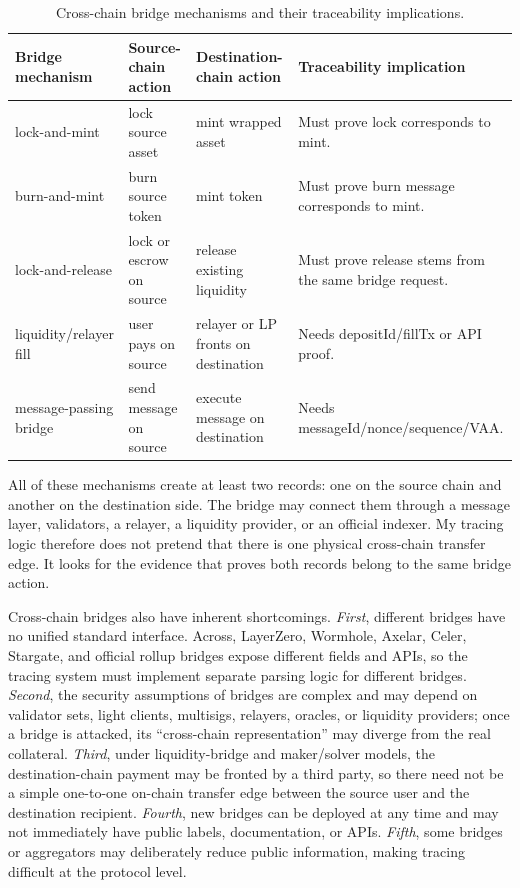 \documentclass[12pt,a4paper]{article}
\begin{document}
\begin{table}[htbp]
\centering
\caption{Cross-chain bridge mechanisms and their traceability implications.}
\label{tab:bridge_mech}
\small
\begin{tabularx}{\textwidth}{l Y Y Y}
\toprule
\textbf{Bridge mechanism} & \textbf{Source-chain action} & \textbf{Destination-chain action} & \textbf{Traceability implication} \\
\midrule
lock-and-mint & lock source asset & mint wrapped asset & Must prove lock corresponds to mint. \\
burn-and-mint & burn source token & mint token & Must prove burn message corresponds to mint. \\
lock-and-release & lock or escrow on source & release existing liquidity & Must prove release stems from the same bridge request. \\
liquidity/relayer fill & user pays on source & relayer or LP fronts on destination & Needs depositId/fillTx or API proof. \\
message-passing bridge & send message on source & execute message on destination & Needs messageId/nonce/sequence/VAA. \\
\bottomrule
\end{tabularx}
\end{table}

All of these mechanisms create at least two records: one on the source chain and another on the destination side. The bridge may connect them through a message layer, validators, a relayer, a liquidity provider, or an official indexer. My tracing logic therefore does not pretend that there is one physical cross-chain transfer edge. It looks for the evidence that proves both records belong to the same bridge action.

Cross-chain bridges also have inherent shortcomings. \textit{First}, different bridges have no unified standard interface. Across, LayerZero, Wormhole, Axelar, Celer, Stargate, and official rollup bridges expose different fields and APIs, so the tracing system must implement separate parsing logic for different bridges. \textit{Second}, the security assumptions of bridges are complex and may depend on validator sets, light clients, multisigs, relayers, oracles, or liquidity providers; once a bridge is attacked, its ``cross-chain representation'' may diverge from the real collateral. \textit{Third}, under liquidity-bridge and maker/solver models, the destination-chain payment may be fronted by a third party, so there need not be a simple one-to-one on-chain transfer edge between the source user and the destination recipient. \textit{Fourth}, new bridges can be deployed at any time and may not immediately have public labels, documentation, or APIs. \textit{Fifth}, some bridges or aggregators may deliberately reduce public information, making tracing difficult at the protocol level.
\end{document}
